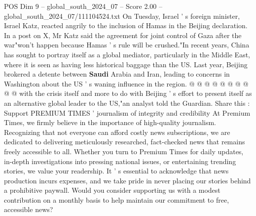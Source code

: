 \begin{textsample}{POS Dim 9 – global\_south\_2024\_07 – Score 2.00 – global\_south\_2024\_07/111104524.txt}
On Tuesday, Israel ' s foreign minister, Israel Katz, reacted angrily to the inclusion of Hamas in the Beijing declaration.
In a post on X, Mr Katz said the agreement for joint control of Gaza after the war"won't happen because Hamas ' s rule will be crushed."In recent years, China has sought to portray itself as a global mediator, particularly in the Middle East, where it is seen as having less historical baggage than the US.
Last year, Beijing brokered a detente between \textbf{Saudi} Arabia and Iran, leading to concerns in Washington about the US ' s waning influence in the region. @ @ @ @ @ @ @ @ @ @ with the crisis itself and more to do with Beijing ' s effort to present itself as an alternative global leader to the US,"an analyst told the Guardian.
Share this : Support PREMIUM TIMES ' journalism of integrity and credibility At Premium Times, we firmly believe in the importance of high-quality journalism.
Recognizing that not everyone can afford costly news subscriptions, we are dedicated to delivering meticulously researched, fact-checked news that remains freely accessible to all.
Whether you turn to Premium Times for daily updates, in-depth investigations into pressing national issues, or entertaining trending stories, we value your readership.
It ' s essential to acknowledge that news production incurs expenses, and we take pride in never placing our stories behind a prohibitive paywall.
Would you consider supporting us with a modest contribution on a monthly basis to help maintain our commitment to free, accessible news?

\end{textsample}
